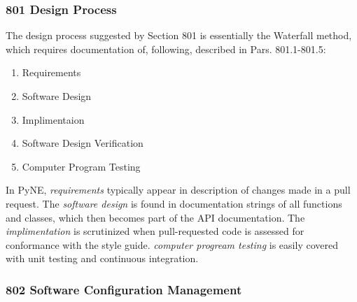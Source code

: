 \documentclass{anstrans}
\begin{document}
\subsubsection{801 Design Process}

The design process suggested by Section 801 is essentially the Waterfall method, which requires documentation of, following, described in Pars. 801.1-801.5:
\begin{enumerate} 
\item{Requirements}
\item{Software Design}
\item{Implimentaion}
\item{Software Design Verification}
\item{Computer Program Testing}
\end{enumerate}

In PyNE, \emph{requirements} typically appear in description of changes made in
a pull request. The \emph{software design} is found in documentation strings of
all functions and classes, which then becomes part of the API documentation.
The \emph{implimentation} is scrutinized when pull-requested code is assessed for
conformance with the style guide. \emph{computer progream testing} is easily covered with unit testing and continuous integration.




\subsubsection{802 Software Configuration Management}
\end{document}
